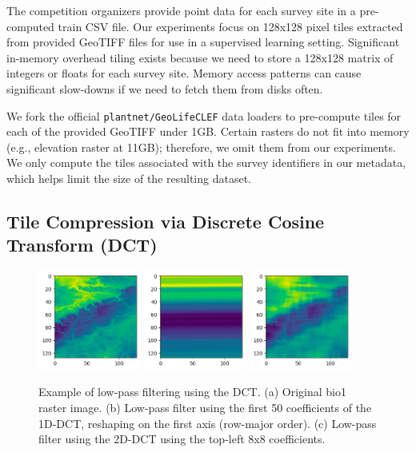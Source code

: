 The competition organizers provide point data for each survey site in a pre-computed train CSV file.
Our experiments focus on 128x128 pixel tiles extracted from provided GeoTIFF files for use in a supervised learning setting.
Significant in-memory overhead tiling exists because we need to store a 128x128 matrix of integers or floats for each survey site.
Memory access patterns can cause significant slow-downs if we need to fetch them from disks often. 

We fork the official \texttt{plantnet/GeoLifeCLEF} data loaders to pre-compute tiles for each of the provided GeoTIFF under 1GB. 
Certain rasters do not fit into memory (e.g., elevation raster at 11GB); therefore, we omit them from our experiments. 
We only compute the tiles associated with the survey identifiers in our metadata, which helps limit the size of the resulting dataset. 

\subsection{Tile Compression via Discrete Cosine Transform (DCT)}

\begin{figure}[h!]
  \centering
  \includegraphics[width=0.3\textwidth]{figures/dct-original.png}
  \hfill
  \includegraphics[width=0.3\textwidth]{figures/dct-1d-lowpass.png}
  \hfill
  \includegraphics[width=0.3\textwidth]{figures/dct-2d-lowpass.png}
  \caption{
    Example of low-pass filtering using the DCT.
    (a) Original bio1 raster image.
    (b) Low-pass filter using the first 50 coefficients of the 1D-DCT, reshaping on the first axis (row-major order).
    (c) Low-pass filter using the 2D-DCT using the top-left 8x8 coefficients.
  }
  \label{fig:dct-lowpass}
\end{figure}

